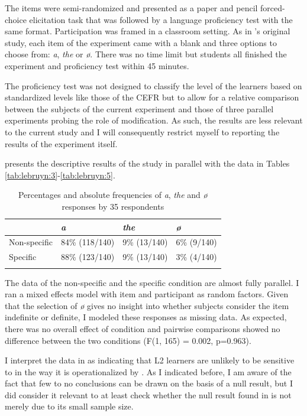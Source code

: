 \documentclass[output=paper,
modfonts
]{langscibook}
\begin{document}
The items were semi-randomized and presented as a paper and pencil forced-choice elicitation task that was followed by a language proficiency test with the same format. Participation was framed in a classroom setting. As in \citeauthor{IoninKoWexler2004}’s original study, each item of the experiment came with a blank and three options to choose from: \textit{a}, \textit{the} or \textit{ø}. There was no time limit but students all finished the experiment and proficiency test within 45 minutes. 

The proficiency test was not designed to classify the level of the learners based on standardized levels like those of the CEFR but to allow for a relative comparison between the subjects of the current experiment and those of three parallel experiments probing the role of modification. As such, the results are less relevant to the current study and I will consequently restrict myself to reporting the results of the experiment itself.

 presents the descriptive results of the study in parallel with the data in Tables \ref{tab:lebruyn:3}-\ref{tab:lebruyn:5}.

\begin{table}[h]
\begin{tabularx}{\textwidth}{XXXX}
\lsptoprule
 & \textit{a} & \textit{the} &  \textit{ø} \\
\midrule
Non-specific & 84\% (118/140) & 9\% (13/140) & 6\% (9/140)  \\
Specific & 88\% (123/140) & 9\% (13/140) & 3\% (4/140) \\
\lspbottomrule
\end{tabularx}
\caption{Percentages and absolute frequencies of \textit{a}, \textit{the} and \textit{ø} responses by 35  respondents}
\label{tab:lebruyn:6}
\end{table}

The data of the non-specific and the specific condition are almost fully parallel. I ran a mixed effects model with item and participant as random factors. Given that the selection of \textit{ø} gives no insight into whether subjects consider the item indefinite or definite, I modeled these responses as missing data. As expected, there was no overall effect of condition and pairwise comparisons showed no difference between the two conditions (F(1, 165) = 0.002, p=0.963).

I interpret the data in  as indicating that  L2 learners are unlikely to be sensitive to  in the way it is operationalized by \citet{IoninKoWexler2004}. As I indicated before, I am aware of the fact that few to no conclusions can be drawn on the basis of a null result, but I did consider it relevant to at least check whether the null result found in \citet{Ting2005} is not merely due to its small sample size.
\end{document}
